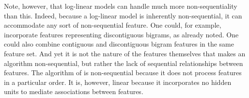 Note, however, that log-linear models can handle much more non-sequentiality than this. Indeed, because a log-linear model is inherently non-sequential, it can accommodate any sort of non-sequential feature. 
One could, for example, incorporate
features representing discontiguous bigrams,
as already noted.
 One could also combine contiguous and discontiguous bigram features in the same feature set.
And yet it is not the nature of the features themselves that makes an algorithm non-sequential, but rather the lack of sequential relationships between features. The algorithm of \cite{poon-et-al:2009} is non-sequential because it does not process features in a particular order.
It is, however, linear because it incorporates no hidden units to mediate associations between features.


